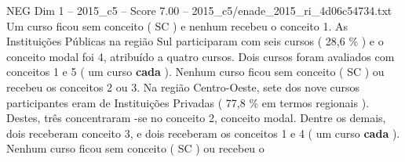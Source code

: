 \begin{textsample}{NEG Dim 1 – 2015\_c5 – Score 7.00 – 2015\_c5/enade\_2015\_ri\_4d06c54734.txt}
Um curso ficou sem conceito ( SC ) e nenhum recebeu o conceito 1.
As Instituições Públicas na região Sul participaram com seis cursos ( 28,6 \% ) e o conceito modal foi 4, atribuído a quatro cursos.
Dois cursos foram avaliados com conceitos 1 e 5 ( um curso \textbf{cada} ).
Nenhum curso ficou sem conceito ( SC ) ou recebeu os conceitos 2 ou 3.
Na região Centro-Oeste, sete dos nove cursos participantes eram de Instituições Privadas ( 77,8 \% em termos regionais ).
Destes, três concentraram -se no conceito 2, conceito modal.
Dentre os demais, dois receberam conceito 3, e dois receberam os conceitos 1 e 4 ( um curso \textbf{cada} ).
Nenhum curso ficou sem conceito ( SC ) ou recebeu o

\end{textsample}
